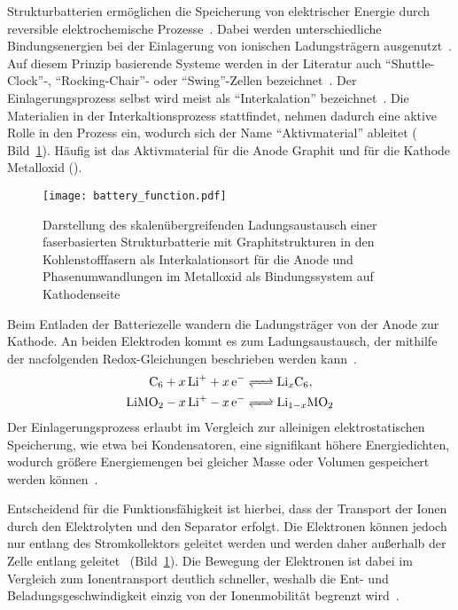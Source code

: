 Strukturbatterien ermöglichen die Speicherung von elektrischer Energie durch reversible elektrochemische Prozesse~\cite{Newman2021}. Dabei werden unterschiedliche Bindungsenergien bei der Einlagerung von ionischen Ladungsträgern ausgenutzt~\cite{Ashcroft2021}. Auf diesem Prinzip basierende Systeme werden in der Literatur auch "`Shuttle-Clock"'-, "`Rocking-Chair"'- oder "`Swing"'-Zellen bezeichnet~\cite{Ohzuku1993,Tarascon1993,Bittihn1993}. Der Einlagerungsprozess selbst wird meist als "`Interkalation"' bezeichnet~\cite{Eichinger1976}. Die Materialien in der Interkaltionsprozess stattfindet, nehmen dadurch eine aktive Rolle in den Prozess ein, wodurch sich der Name "`Aktivmaterial"' ableitet ( Bild~\ref{fig:battery_function}). Häufig ist das Aktivmaterial für die Anode Graphit und für die Kathode Metalloxid ().
\begin{figure}[ht]
        \center
	\texttt{[image: battery\_function.pdf]}
		\caption{\label{fig:battery_function}Darstellung des skalenübergreifenden Ladungsaustausch einer faserbasierten Strukturbatterie mit Graphitstrukturen in den Kohlenstofffasern als Interkalationsort für die Anode und Phasenumwandlungen im Metalloxid als Bindungssystem auf Kathodenseite}
\end{figure}
Beim Entladen der Batteriezelle wandern die Ladungsträger von der Anode zur Kathode. An beiden Elektroden kommt es zum Ladungsaustausch, der mithilfe der nacfolgenden Redox-Gleichungen beschrieben werden kann~\cite{Goodenough2013}. 
\begin{align}
	\ce{C_6 + x Li^+ + x e^- &<=> Li_xC_6},\\ 
	\ce{LiMO_2 - x Li^+ - x e^- &<=> Li_{1-x}MO_2} 
\end{align} 
Der Einlagerungsprozess erlaubt im Vergleich zur alleinigen elektrostatischen Speicherung, wie etwa bei Kondensatoren, eine signifikant höhere Energiedichten, wodurch größere Energiemengen bei gleicher Masse oder Volumen gespeichert werden können~\cite{Newman2021}.

Entscheidend für die Funktionsfähigkeit ist hierbei, dass der Transport der Ionen durch den Elektrolyten und den Separator erfolgt. Die Elektronen können jedoch nur entlang des Stromkollektors geleitet werden und werden daher außerhalb der Zelle entlang geleitet~\cite{Plett2015} (Bild~\ref{fig:battery_function}). Die Bewegung der Elektronen ist dabei im Vergleich zum Ionentransport deutlich schneller, weshalb die Ent- und Beladungsgeschwindigkeit einzig von der Ionenmobilität begrenzt wird~\cite{Plett2024}.

